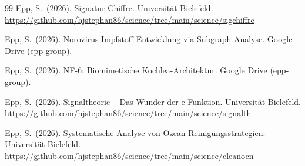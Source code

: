 ﻿\documentclass[a4paper,12pt]{article}
\theoremstyle{plain}
\theoremstyle{definition}
\theoremstyle{remark}
\begin{document}
\begin{thebibliography}{99}
Epp, S.\ (2026).
Signatur-Chiffre.
Universit\"at Bielefeld.
\url{https://github.com/hjstephan86/science/tree/main/science/sigchiffre}

Epp, S.\ (2026).
Norovirus-Impfstoff-Entwicklung via Subgraph-Analyse.
Google Drive (epp-group).

Epp, S.\ (2026).
NF-6: Biomimetische Kochlea-Architektur.
Google Drive (epp-group).

Epp, S.\ (2026).
Signaltheorie -- Das Wunder der e-Funktion.
Universit\"at Bielefeld.
\url{https://github.com/hjstephan86/science/tree/main/science/signalth}

Epp, S.\ (2026).
Systematische Analyse von Ozean-Reinigungsstrategien.
Universit\"at Bielefeld.
\url{https://github.com/hjstephan86/science/tree/main/science/cleanocn}

\end{thebibliography}
\end{document}
